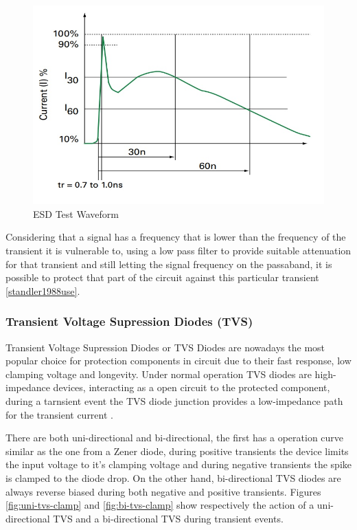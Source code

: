 	\begin{figure}[htbp]
		\centering
			\includegraphics[scale=0.6]{figuras/fig-esd-test-waveform}
		\caption{ESD Test Waveform \cite{esd-test-waveform}}
		\label{fig:esd-test-waveform}
	\end{figure}

	Considering that a signal has a frequency that is lower than the frequency of the transient it is vulnerable to, using a low pass filter to provide suitable attenuation for that transient and still letting the signal frequency on the passaband, it is possible to protect that part of the circuit against this particular transient \ref{standler1988use}. 


\subsubsection{Transient Voltage Supression Diodes (TVS)}\label{ssec:tvsTransientProtection}

	\label{ssssec:tvsOperation}
		Transient Voltage Supression Diodes or TVS Diodes are nowadays the most popular choice for protection components in circuit due to their fast response, low clamping voltage and longevity. Under normal operation TVS diodes are high-impedance devices, interacting as a open circuit to the protected component, during a tarnsient event the TVS diode junction provides a low-impedance path for the transient current \cite{renesasTVS}.
		\par
		There are both uni-directional and bi-directional, the first has a operation curve similar as the one from a Zener diode, during positive transients the device limits the input voltage to it's clamping voltage and during negative transients the spike is clamped to the diode drop. On the other hand, bi-directional TVS diodes are always reverse biased during both negative and positive transients. Figures \ref{fig:uni-tvs-clamp} and \ref{fig:bi-tvs-clamp} show respectively the action of a uni-directional TVS and a bi-directional TVS during transient events.

